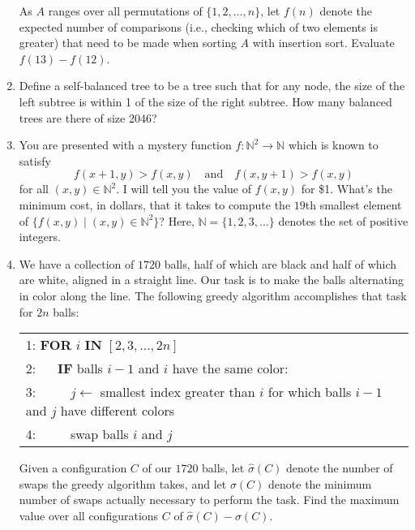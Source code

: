 \documentclass[10pt]{article}
\begin{document}
\begin{enumerate}
	As $A$ ranges over all permutations of $\{1, 2, \ldots, n\}$, let $f(n)$ denote the expected number of comparisons (i.e., checking which of two elements is greater) that need to be made when sorting $A$ with insertion sort. Evaluate $f(13) - f(12)$.




\item Define a self-balanced tree to be a tree such that for any node, the size of the left subtree is within 1 of the size of the right subtree. How many balanced trees are there of size 2046?




\item You are presented with a mystery function $f:\mathbb N^2\to\mathbb N$ which is known to satisfy \[f(x+1,y)>f(x,y)\quad\text{and}\quad f(x,y+1)>f(x,y)\] for all $(x,y)\in\mathbb N^2$. I will tell you the value of $f(x,y)$ for \$1. What's the minimum cost, in dollars, that it takes to compute the $19$th smallest element of $\{f(x,y)\mid(x,y)\in\mathbb N^2\}$? Here, $\mathbb N=\{1,2,3,\dots\}$ denotes the set of positive integers.





\item We have a collection of $1720$ balls, half of which are black and half of which are white, aligned in a straight line. Our task is to make the balls alternating in color along the line. The following greedy algorithm accomplishes that task for $2n$ balls:

\iffalse
\begin{verbatim}
for i = 2, 3, ..., 2n
  if balls i-1 and i have the same color
    j <- smallest index > i for which balls i-1 and j have different colors
    swap balls i and j
\end{verbatim}
\fi

\begin{tabular}{l}
1: \textbf{FOR} $i$ \textbf{IN} $[2,3,\dots,2n]$ \\
2: $\quad$ \textbf{IF} balls $i-1$ and $i$ have the same color: \\
3: $\quad\quad$ $j\gets$ smallest index greater than $i$ for which balls $i-1$ and $j$ have different colors \\
4: $\quad\quad$ swap balls $i$ and $j$
\end{tabular}

Given a configuration $C$ of our $1720$ balls, let $\hat{\sigma}(C)$ denote the number of swaps the greedy algorithm takes, and let $\sigma(C)$ denote the minimum number of swaps actually necessary to perform the task. Find the maximum value over all configurations $C$ of $\hat{\sigma}(C)-\sigma(C)$.






\end{enumerate}
\end{document}
